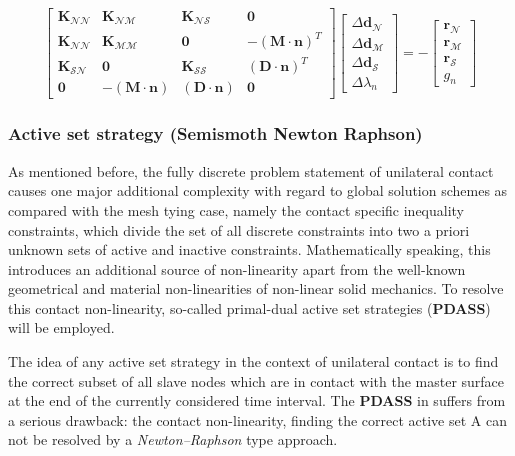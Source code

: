 \documentclass[a4paper,10pt]{article} %
\begin{document}
\begin{equation}\label{eq:eq24}
 \left[ \begin{array}{cccc} \mathbf{K}_{\mathcal{N}\mathcal{N}} &  \mathbf{K}_{\mathcal{N}\mathcal{M}} & \mathbf{K}_{\mathcal{N}\mathcal{S}} & \mathbf{0} \\ \mathbf{K}_{\mathcal{N}\mathcal{N}}  & \mathbf{K}_{\mathcal{M}\mathcal{M}} & \mathbf{0} & -(\mathbf{M}\cdot \mathbf{n})^{T} \\ \mathbf{K}_{\mathcal{S}\mathcal{N}} & \mathbf{0} & \mathbf{K}_{\mathcal{S}\mathcal{S}} & (\mathbf{D}\cdot \mathbf{n})^T \\ \mathbf{0} & -(\mathbf{M}\cdot \mathbf{n}) & (\mathbf{D}\cdot \mathbf{n}) & \mathbf{0}   \end{array} \right] \left[ \begin{array}{c} \Delta\mathbf{d}_{\mathcal{N}} \\ \Delta\mathbf{d}_{\mathcal{M}} \\ \Delta\mathbf{d}_{\mathcal{S}} \\ \Delta\lambda_n \end{array} \right] = - \left[ \begin{array}{c} \mathbf{r}_{\mathcal{N}} \\ \mathbf{r}_{\mathcal{M}} \\ \mathbf{r}_{\mathcal{S}} \\ g_n \end{array} \right]
\end{equation}

\subsubsection{Active set strategy (Semismoth Newton Raphson)}

As mentioned before, the fully discrete problem statement of unilateral contact causes one major additional complexity with regard to global solution schemes as compared with the mesh tying case, namely the contact specific inequality constraints, which divide the set of all discrete constraints into two a priori unknown sets of active and inactive constraints. Mathematically speaking, this introduces an additional source of non-linearity apart from the well-known geometrical and material non-linearities of non-linear solid mechanics. To resolve this contact non-linearity, so-called primal-dual active set strategies (\textbf{PDASS}) will be employed.

The idea of any active set strategy in the context of unilateral contact is to find the correct subset of all slave nodes which are in contact with the master surface at the end of the currently considered time interval. The \textbf{PDASS} in  suffers from a serious drawback: the contact non-linearity, finding the correct active set A can not be resolved by a \textit{Newton–Raphson} type approach.
\end{document}
